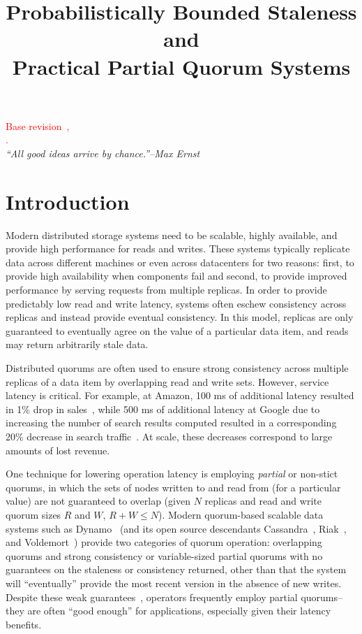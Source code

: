 \documentclass{vldb}
\title{Probabilistically Bounded Staleness and\\ Practical Partial Quorum Systems}
\begin{document}

\maketitle


\noindent\textcolor{red}{Base revision~\GITAbrHash,~\GITAuthorDate\\\GITAuthorName.}\\

\noindent\textit{``All good ideas arrive by chance.''--Max Ernst}



\section{Introduction}

Modern distributed storage systems need to be scalable, highly
available, and provide high performance for reads and writes.  These
systems typically replicate data across different machines or even
across datacenters for two reasons: first, to provide high
availability when components fail and second, to provide improved
performance by serving requests from multiple replicas.  In order to
provide predictably low read and write latency, systems often eschew
consistency across replicas and instead provide eventual
consistency. In this model, replicas are only guaranteed to eventually
agree on the value of a particular data item, and reads may return
arbitrarily stale data.

Distributed quorums are often used to ensure strong consistency across
multiple replicas of a data item by overlapping read and write
sets. However, service latency is critical. For example, at Amazon,
100 ms of additional latency resulted in 1\% drop in
sales~\cite{amazon-latency}, while 500 ms of additional latency at
Google due to increasing the number of search results computed
resulted in a corresponding 20\% decrease in search
traffic~\cite{google-talk}.  At scale, these decreases correspond to
large amounts of lost revenue.

One technique for lowering operation latency is employing
\textit{partial} or non-stict quorums, in which the sets of nodes
written to and read from (for a particular value) are not guaranteed
to overlap (given $N$ replicas and read and write quorum sizes $R$ and
$W$, $R+W \leq N$).  Modern quorum-based scalable data systems such as
Dynamo~\cite{dynamo} (and its open source descendants
Cassandra~\cite{cassandra}, Riak~\cite{riak}, and
Voldemort~\cite{voldemort}) provide two categories of quorum
operation: overlapping quorums and strong consistency or
variable-sized partial quorums with no guarantees on the staleness or
consistency returned, other than that the system will ``eventually''
provide the most recent version in the absence of new writes.  Despite
these weak guarantees~\cite{hamilton-cap, cops, walter},
operators frequently employ partial quorums--they are often ``good
enough'' for applications, especially given their latency benefits.
\end{document}
